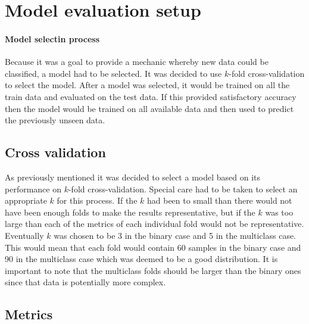 \documentclass[british]{article}
\begin{document}
	
	\section{Model evaluation setup}
	\paragraph{Model selectin process} Because it was a goal to provide a mechanic whereby new data could be classified, a model had to be selected. It was decided to use $k$-fold cross-validation to select the model. After a model was selected, it would be trained on all the train data and evaluated on the test data. If this provided satisfactory accuracy then the model would be trained on all available data and then used to predict the previously unseen data. 
	
	\subsection{Cross validation} As previously mentioned it was decided to select a model based on its performance on $k$-fold cross-validation. Special care had to be taken to select an appropriate $k$ for this process. If the $k$ had been to small than there would not have been enough folds to make the results representative, but if the $k$ was too large than each of the metrics of each individual fold would not be representative. Eventually $k$ was chosen to be 3 in the binary case and 5 in the multiclass case. This would mean that each fold would contain 60 samples in the binary case and 90 in the multiclass case which was deemed to be a good distribution. It is important to note that the multiclass folds should be larger than the binary ones since that data is potentially more complex. 
	
	\subsection{Metrics}
	\label{metrics} 
	
\end{document}
